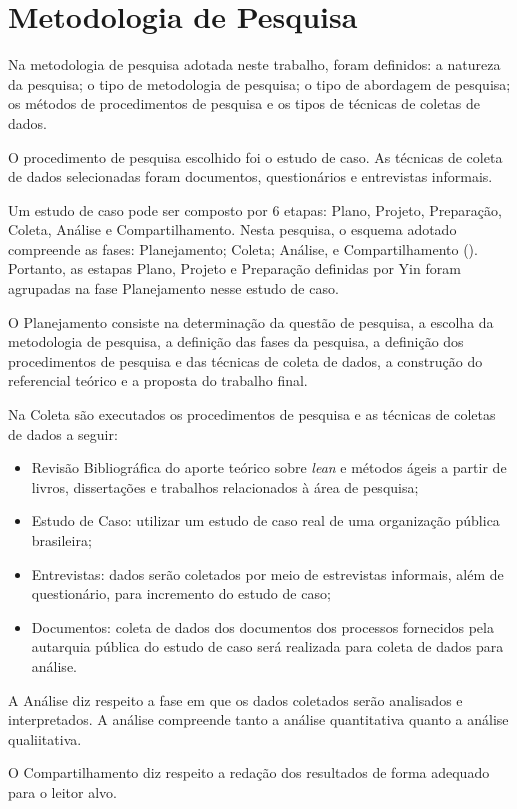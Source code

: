 \section[Metodologia de Pesquisa]{Metodologia de Pesquisa}

Na metodologia de pesquisa adotada neste trabalho, foram definidos: a natureza da pesquisa; o tipo de metodologia de pesquisa; o tipo de abordagem de pesquisa; os métodos de
procedimentos de pesquisa e os tipos de técnicas de coletas de dados.

O procedimento de pesquisa escolhido foi o estudo de caso. As técnicas de coleta de dados selecionadas foram
documentos, questionários e entrevistas informais. 

Um estudo de caso pode ser composto por 6 etapas: Plano, Projeto, Preparação, Coleta, Análise e Compartilhamento. Nesta pesquisa, o esquema adotado compreende as fases: Planejamento; Coleta; Análise, e Compartilhamento (\cite{yin}). Portanto, as estapas Plano, Projeto e Preparação definidas por Yin foram agrupadas na fase Planejamento nesse estudo de caso.

O Planejamento consiste na determinação da questão de pesquisa, a escolha da metodologia de pesquisa, a definição das fases da pesquisa,  a definição dos procedimentos de pesquisa e das técnicas de coleta de dados, a construção do referencial teórico e a proposta do trabalho final.


Na Coleta são executados os procedimentos de pesquisa e as técnicas de coletas de dados a seguir:

\begin{itemize}
\item Revisão Bibliográfica do aporte teórico sobre \textit{lean} e métodos ágeis a partir de livros, dissertações e trabalhos relacionados à área de pesquisa;
\item Estudo de Caso: utilizar um estudo de caso real de uma organização pública brasileira;
\item Entrevistas: dados serão coletados por meio de estrevistas informais, além de questionário, para incremento do estudo de caso;
\item Documentos: coleta de dados dos documentos dos processos fornecidos pela autarquia pública do estudo de caso será realizada para coleta de dados para análise.
\end{itemize}

A Análise diz respeito a fase em que os dados coletados serão analisados e interpretados. A análise compreende tanto a análise quantitativa quanto a análise qualiitativa.

O Compartilhamento diz respeito a redação dos resultados de forma adequado para o leitor alvo.